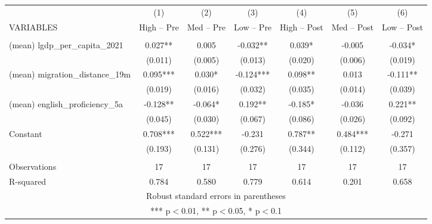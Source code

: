 \begin{tabular}{lcccccc} \hline
 & (1) & (2) & (3) & (4) & (5) & (6) \\
VARIABLES & High – Pre & Med – Pre & Low – Pre & High – Post & Med – Post & Low – Post \\ \hline
 &  &  &  &  &  &  \\
(mean) lgdp\_per\_capita\_2021 & 0.027** & 0.005 & -0.032** & 0.039* & -0.005 & -0.034* \\
 & (0.011) & (0.005) & (0.013) & (0.020) & (0.006) & (0.019) \\
(mean) migration\_distance\_19m & 0.095*** & 0.030* & -0.124*** & 0.098** & 0.013 & -0.111** \\
 & (0.019) & (0.016) & (0.032) & (0.035) & (0.014) & (0.039) \\
(mean) english\_proficiency\_5a & -0.128** & -0.064* & 0.192** & -0.185* & -0.036 & 0.221** \\
 & (0.045) & (0.030) & (0.067) & (0.086) & (0.026) & (0.092) \\
Constant & 0.708*** & 0.522*** & -0.231 & 0.787** & 0.484*** & -0.271 \\
 & (0.193) & (0.131) & (0.276) & (0.344) & (0.112) & (0.357) \\
 &  &  &  &  &  &  \\
Observations & 17 & 17 & 17 & 17 & 17 & 17 \\
 R-squared & 0.784 & 0.580 & 0.779 & 0.614 & 0.201 & 0.658 \\ \hline
\multicolumn{7}{c}{ Robust standard errors in parentheses} \\
\multicolumn{7}{c}{ *** p$<$0.01, ** p$<$0.05, * p$<$0.1} \\
\end{tabular}